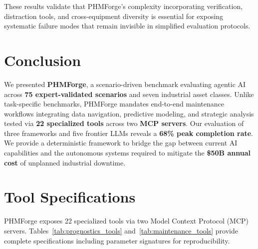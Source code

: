 \documentclass[sigconf, screen, nonacm]{acmart}
\begin{document}
These results validate that PHMForge's complexity incorporating verification, distraction tools, and cross-equipment diversity is essential for exposing systematic failure modes that remain invisible in simplified evaluation protocols.

\section{Conclusion}
We presented \textbf{PHMForge}, a scenario-driven benchmark evaluating agentic AI across \textbf{75 expert-validated scenarios} and seven industrial asset classes. Unlike task-specific benchmarks, PHMForge mandates end-to-end maintenance workflows integrating data navigation, predictive modeling, and strategic analysis tested via \textbf{22 specialized tools} across two \textbf{MCP servers}. Our evaluation of three frameworks and five frontier LLMs reveals a \textbf{68\% peak completion rate}. We provide a deterministic framework to bridge the gap between current AI capabilities and the autonomous systems required to mitigate the \textbf{\$50B annual cost} of unplanned industrial downtime.







\appendix

\section{Tool Specifications}
\label{app:tools}

PHMForge exposes 22 specialized tools via two Model Context Protocol (MCP) servers. Tables~\ref{tab:prognostics_tools} and~\ref{tab:maintenance_tools} provide complete specifications including parameter signatures for reproducibility.
\end{document}
